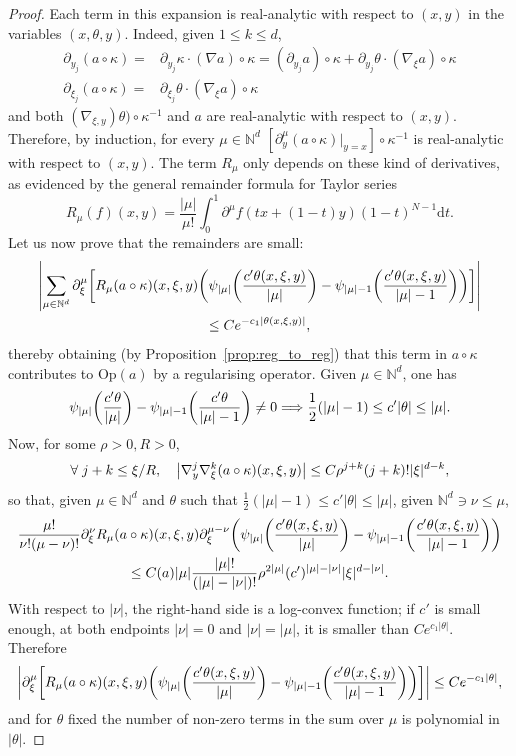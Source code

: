 \documentclass[AHL,Unicode,longabstracts,published]{cedram}
\newcommand{\Opp}{\mathrm{Op}}
\newcommand\1{\mathds{1}}
\newcommand{\N}{\mathbb{N}}
\newcommand{\dd}{\mathrm{d}}
\let\oldforall\forall
\renewcommand*{\forall}{\mathrel{\oldforall}}
\renewcommand*{\implies}{\mathchoice{\Longrightarrow}{\Rightarrow}{\Rightarrow}{\Rightarrow}}
\let\originalleft\left
\let\originalright\right
\renewcommand{\left}{\mathopen{}\mathclose\bgroup\originalleft}
\renewcommand{\right}{\aftergroup\egroup\originalright}
\begin{document}
\begin{proof}
Each term in this expansion is real-analytic with respect to $(x,y)$ in the variables $(x,\theta,y)$. Indeed, given $1\leq k\leq d$,
\begin{align*}
\partial_{y_j}(a\circ \kappa)=&\partial_{y_j}\kappa\cdot (\nabla a)\circ \kappa=(\partial_{y_j}a)\circ \kappa+\partial_{y_j}\theta\cdot (\nabla_{\xi}a)\circ \kappa\\
\partial_{\xi_j}(a\circ \kappa)=&\partial_{\xi_j}\theta\cdot (\nabla_{\xi} a)\circ \kappa
\end{align*}
and both $(\nabla_{\xi,y}) \theta)\circ \kappa^{-1}$ and $a$ are real-analytic with respect to $(x,y)$. Therefore, by induction, for every $\mu\in \N^{d}$ $[\partial_y^{\mu}(a\circ \kappa)|_{y=x}]\circ \kappa^{-1}$ is real-analytic with respect to $(x,y)$. The term $R_{\mu}$ only depends on these kind of derivatives, as evidenced by the general remainder formula for Taylor series
\[
R_{\mu}(f)(x,y)=\frac{|\mu|}{\mu!}\int_0^1\partial^{\mu}f(tx+(1-t)y)(1-t)^{N-1}\dd t.
\]
Let us now prove that the remainders are small:
\begin{multline*}
\left|\sum_{\mu\in
\N^d}\partial_{\xi}^{\mu}\left[R_{\mu}(a\circ
\kappa)(x,\xi,y)\left(\psi_{|\mu|}\left(\frac{c'\theta(x,\xi,y)}{|\mu|}\right)-\psi_{|\mu|-1}\left(\frac{c'\theta(x,\xi,y)}{|\mu|-1}
\right)\right)\right]\right|\\
\leq Ce^{-c_1|\theta(x,\xi,y)|},
\end{multline*}
thereby obtaining (by Proposition~\ref{prop:reg_to_reg}) that this term in $a\circ \kappa$ contributes to $\Opp(a)$ by a regularising operator. Given $\mu\in \N^d$, one has
\[
\psi_{|\mu|}\left(\frac{c'\theta}{|\mu|}\right)-\psi_{|\mu|-1}\left(\frac{c'\theta}{|\mu|-1}\right)\neq 0 \implies \frac 12 (|\mu|-1)\leq c'|\theta|\leq |\mu|.
\]
Now, for some $\rho>0,R>0$,
\[
\forall j+k\leq \xi/R,\quad \left|\nabla^j_y\nabla^k_{\xi}(a\circ \kappa)(x,\xi,y)\right|\leq C\rho^{j+k}(j+k)!|\xi|^{d-k},
\]
so that, given $\mu\in \N^d$ and $\theta$ such that $ \frac 12 (|\mu|-1)\leq c'|\theta|\leq |\mu|$, given $\N^{d}\ni \nu\leq
\mu$,
\begin{multline*}
\frac{\mu!}{\nu!(\mu-\nu)!}\partial_{\xi}^\nu R_{\mu}(a\circ
\kappa)(x,\xi,y)\partial_{\xi}^{\mu-\nu}\left(\psi_{|\mu|}
\left(\frac{c'\theta(x,\xi,y)}{|\mu|}\right)-\psi_{|\mu|-1}
\left(\frac{c'\theta(x,\xi,y)}{|\mu|-1}\right)\right)\\
\leq C(a)|\mu|\frac{|\mu|!}{(|\mu|-|\nu|)!}\rho^{2|\mu|}(c')^{|\mu|-|\nu|}|\xi|^{d-|\nu|}.
\end{multline*}
With respect to $|\nu|$, the right-hand side is a log-convex function; if $c'$ is small enough, at both endpoints $|\nu|=0$ and $|\nu|=|\mu|$, it is smaller than $Ce^{c_1|\theta|}$. Therefore
\[
\left|\partial_{\xi}^{\mu}\left[R_{\mu}(a\circ
\kappa)(x,\xi,y)\left(\psi_{|\mu|}\left(\frac{c'\theta(x,\xi,y)}{|\mu|}\right)-\psi_{|\mu|-1}\left(\frac{c'\theta(x,\xi,y)}{|\mu|-1}\right)\right)\right]\right|\leq Ce^{-c_1|\theta|},
\]
and for $\theta$ fixed the number of non-zero terms in the sum over $\mu$ is polynomial in $|\theta|$.


\end{proof}
\end{document}
